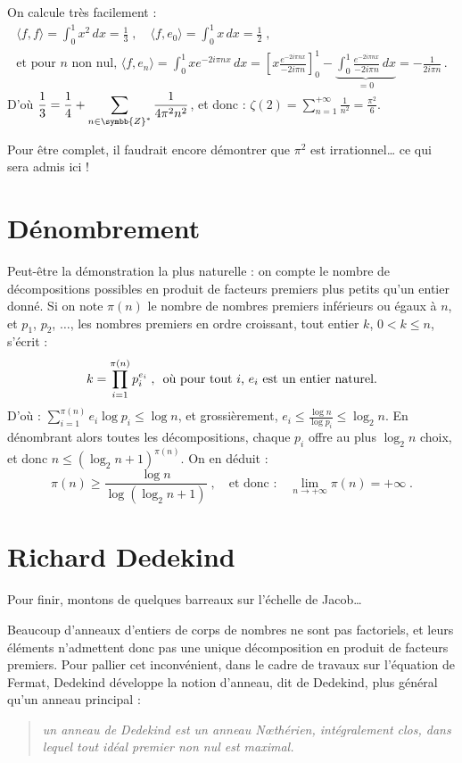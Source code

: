 \documentclass[a4paper,11pt]{article}
\newcommand{\Z}{\ensuremath{\symbb{Z}}\xspace}
\begin{document}
On calcule très facilement :
\begin{gather*}
  \langle f,f \rangle = \int_0^1 x^2\,dx = \frac{1}{3} \;,\quad
  \langle f,e_0 \rangle = \int_0^1 x\,dx = \frac{1}{2} \;, \\
  \mbox{et pour $n$ non nul, }
  \langle f,e_n \rangle = \int_0^1 x e^{-2i\pi n x}\,dx
  =\left[x\frac{e^{-2i\pi n x}}{-2i\pi n}\right]_0^1
  -\underbrace{\int_0^1 \frac{e^{-2i\pi n x}}{-2i\pi n}\,dx}_{=0}
  =-\frac{1}{2i\pi n} \,.
\end{gather*}
D'où\quad
$\displaystyle\frac{1}{3}=\frac{1}{4}+\sum_{n\in\Z^*}\frac{1}{4\pi^2 n^2}$,
\quad et donc :\quad
$\displaystyle\zeta(2)=\sum_{n=1}^{+\infty} \frac{1}{n^2}=\frac{\pi^2}{6}$.

\medskip
Pour être complet, il faudrait encore démontrer que $\pi^2$ est
irrationnel\dots{} ce qui sera admis ici !

\section{Dénombrement}

Peut-être la démonstration la plus naturelle : on compte le nombre de
décompositions possibles en produit de facteurs premiers plus petits qu'un
entier donné. Si on note $\pi(n)$ le nombre de nombres premiers inférieurs
ou égaux à $n$, et $p_1$, $p_2$, $\ldots$, les nombres premiers en ordre
croissant, tout entier $k$, $0<k\le n$, s'écrit :
\[
  k = \prod_{i=1}^{\pi(n)} p_i^{e_i}\;,
  \mbox{\enspace où pour tout $i$, $e_i$ est un entier naturel.}
\]
D'où : $\displaystyle\sum_{i=1}^{\pi(n)} e_i\log p_i \le\log n$,
et grossièrement,
$\displaystyle  e_i\le\frac{\log n}{\log p_i} \le \log_2 n$.
En dénombrant alors toutes les décompositions, chaque $p_i$ offre
au plus $\log_2 n$ choix, et donc
$\displaystyle n \le (\log_2 n + 1)^{\pi(n)}$. On en déduit :
\[
  \pi(n) \ge \frac{\log n}{\log(\log_2 n +1)}\;,\quad\mbox{et donc :}\quad
  \lim_{n\to+\infty}\pi(n) = +\infty\;.
\]

\section{Richard Dedekind}

Pour finir, montons de quelques barreaux sur l'échelle de Jacob\dots

\noindent
Beaucoup d'anneaux d'entiers de corps de nombres ne sont pas factoriels,
et leurs éléments n'admettent donc pas une unique décomposition en produit de
facteurs premiers. Pour pallier cet inconvénient, dans le cadre de travaux
sur l'équation de Fermat, Dedekind développe la notion d'anneau,
dit de Dedekind, plus général qu'un anneau principal :
\begin{quotation}
  \noindent\itshape
  un anneau de Dedekind est un anneau Nœthérien, intégralement clos,
  dans lequel tout idéal premier non nul est maximal.
\end{quotation}
\end{document}

